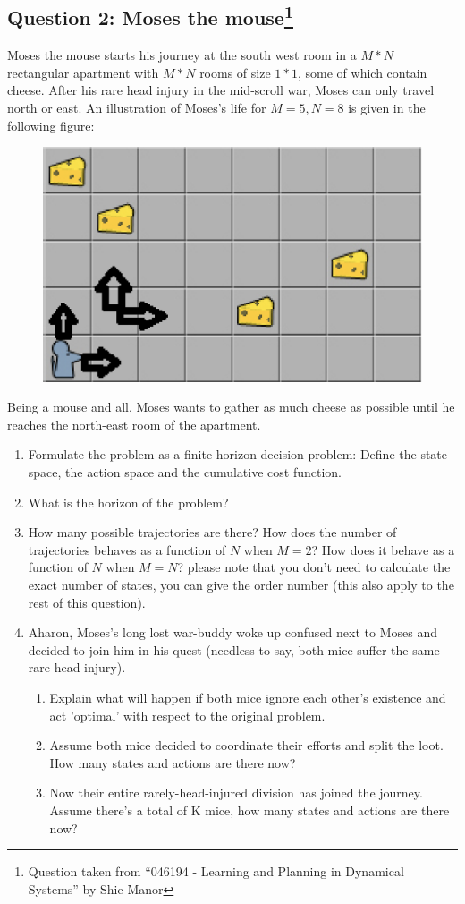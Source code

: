 \documentclass[11pt]{article}
\begin{document}
\subsection{Question 2: Moses the mouse\protect\footnote{Question taken from ``046194 - Learning and Planning in Dynamical Systems'' by Shie Manor\textcopyright}}

Moses the mouse starts his journey at the south west room
in a $M*N$ rectangular apartment with $M*N$ rooms of size $1*1$,  some of which contain
cheese. After his rare head injury in the mid-scroll war, Moses can only travel north or
east. An illustration of Moses's life for $M=5, N=8$  is given in the following figure:  

\begin{figure}[ht!]
  \centering
  \includegraphics[width=.6780\linewidth]{moses.png}
\end{figure}

Being a mouse and all, Moses wants to gather as much cheese as possible until he
reaches the north-east room of the apartment.

\begin{enumerate}
\item Formulate the problem as a finite horizon decision problem: Define the state space,
the action space and the cumulative cost function.
\item What is the horizon of the problem?
\item How many possible trajectories are there? How does the number of trajectories
behaves as a function of $N$ when $M = 2$? How does it behave as a function of $N$
when $M = N$? please note that you don't need to calculate the exact number of states, you can give the order number (this also apply to the rest of this question).
\item Aharon, Moses's long lost war-buddy woke up confused next to Moses and decided
to join him in his quest (needless to say, both mice suffer the same rare head injury). 
\begin{enumerate}[label=(\alph*)]
\item Explain what will happen if both mice ignore each other's existence and act
'optimal' with respect to the original problem.
\item Assume both mice decided to coordinate their efforts and split the loot. How
many states and actions are there now?
\item Now their entire rarely-head-injured division has joined the journey. Assume
there's a total of K mice, how many states and actions are there now?
\end{enumerate}
\end{enumerate}
\end{document}
